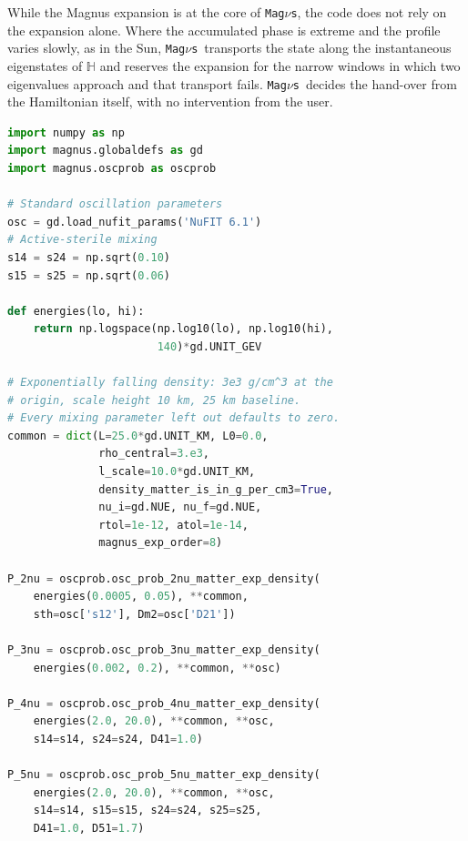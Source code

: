 \documentclass[final,5p,times,twocolumn,sort,compress]{elsarticle}
\makeatletter
\newcommand{\fig}{Fig.}
\DeclareRobustCommand{\_}{%
  \ifmmode\nfss@text{\textunderscore}\else\textunderscore\allowbreak\fi}
\newcommand{\figu}[1]{\fig~\ref{fig:#1}}
\newcommand{\magnus}{{\tt Mag}\ensuremath{\nu}{\tt s}}
\makeatother
\begin{document}
While the Magnus expansion is at the core of \magnus, the code does not rely on the expansion alone. Where the accumulated phase is extreme and the profile varies slowly, as in the Sun, \magnus\ transports the state along the instantaneous eigenstates of $\mathbb{H}$ and reserves the expansion for the narrow windows in which two eigenvalues approach and that transport fails. \magnus\ decides the hand-over from the Hamiltonian itself, with no intervention from the user.

\begin{lstlisting}[language=Python, caption={\textbf{Neutrino oscillation probabilities in \magnus\ at two to five flavors.} The code behind \figu{validation}: the $\nu_e$ survival probability along an exponentially falling density profile at two, three, four (3+1), and five (3+2) flavors, one panel each. Each flavor count has its own wrapper, and the four calls differ only in the energy window and in the sterile mixing. The oscillation parameters are the NuFIT 6.1 best fit~\cite{NuFIT61, Esteban:2024eli}, in normal ordering with Super-Kamiokande atmospheric data. Both sterile cases use $\sin^2\theta_{14} = \sin^2\theta_{24} = 0.1$ and $\Delta m_{41}^2 = 1$~eV$^2$; the 3+2 case adds $\sin^2\theta_{15} = \sin^2\theta_{25} = 0.06$ and $\Delta m_{51}^2 = 1.7$~eV$^2$. All other active-sterile parameters are zero. The tolerances, ${\tt rtol} = 10^{-12}$ and ${\tt atol} = 10^{-14}$, are tightened from the default of $10^{-3}$ to match the comparison.}, label={lst:validation}, float=t]
import numpy as np
import magnus.globaldefs as gd
import magnus.oscprob as oscprob

# Standard oscillation parameters
osc = gd.load_nufit_params('NuFIT 6.1')
# Active-sterile mixing
s14 = s24 = np.sqrt(0.10)
s15 = s25 = np.sqrt(0.06)

def energies(lo, hi):
    return np.logspace(np.log10(lo), np.log10(hi),
                       140)*gd.UNIT_GEV

# Exponentially falling density: 3e3 g/cm^3 at the
# origin, scale height 10 km, 25 km baseline.
# Every mixing parameter left out defaults to zero.
common = dict(L=25.0*gd.UNIT_KM, L0=0.0,
              rho_central=3.e3,
              l_scale=10.0*gd.UNIT_KM,
              density_matter_is_in_g_per_cm3=True,
              nu_i=gd.NUE, nu_f=gd.NUE,
              rtol=1e-12, atol=1e-14,
              magnus_exp_order=8)

P_2nu = oscprob.osc_prob_2nu_matter_exp_density(
    energies(0.0005, 0.05), **common,
    sth=osc['s12'], Dm2=osc['D21'])

P_3nu = oscprob.osc_prob_3nu_matter_exp_density(
    energies(0.002, 0.2), **common, **osc)

P_4nu = oscprob.osc_prob_4nu_matter_exp_density(
    energies(2.0, 20.0), **common, **osc,
    s14=s14, s24=s24, D41=1.0)

P_5nu = oscprob.osc_prob_5nu_matter_exp_density(
    energies(2.0, 20.0), **common, **osc,
    s14=s14, s15=s15, s24=s24, s25=s25,
    D41=1.0, D51=1.7)
\end{lstlisting}
\end{document}

